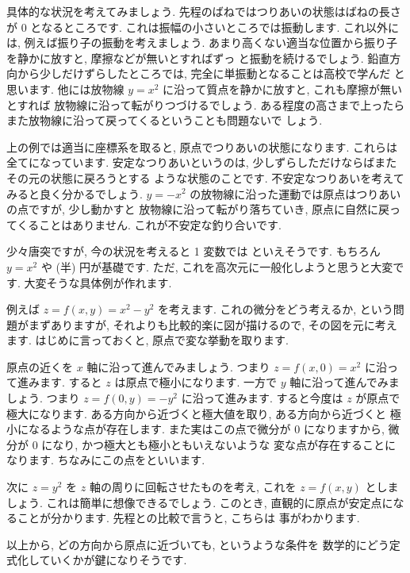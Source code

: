 \documentclass[openany, a4paper, oneside]{jsbook}
\begin{document}
具体的な状況を考えてみましょう.
先程のばねではつりあいの状態はばねの長さが 0 となるところです.
これは振幅の小さいところでは振動します.
これ以外には, 例えば振り子の振動を考えましょう.
あまり高くない適当な位置から振り子を静かに放すと, 摩擦などが無いとすればずっ
と振動を続けるでしょう.
鉛直方向から少しだけずらしたところでは, 完全に単振動となることは高校で学んだ
と思います.
他には放物線 $y=x^2$ に沿って質点を静かに放すと, これも摩擦が無いとすれば
放物線に沿って転がりつづけるでしょう.
ある程度の高さまで上ったらまた放物線に沿って戻ってくるということも問題ないで
しょう.

上の例では適当に座標系を取ると, 原点でつりあいの状態になります.
これらは全てになっています.
安定なつりあいというのは, 少しずらしただけならばまたその元の状態に戻ろうとする
ような状態のことです.
不安定なつりあいを考えてみると良く分かるでしょう.
 $y=-x^2$ の放物線に沿った運動では原点はつりあいの点ですが, 少し動かすと
放物線に沿って転がり落ちていき, 原点に自然に戻ってくることはありません.
これが不安定な釣り合いです.

少々唐突ですが, 今の状況を考えると 1 変数では
といえそうです. もちろん $y=x^2$ や (半) 円が基礎です.
ただ, これを高次元に一般化しようと思うと大変です.
大変そうな具体例が作れます.

例えば $z=f (x,y)=x^2-y^2$ を考えます.
これの微分をどう考えるか, という問題がまずありますが,
それよりも比較的楽に図が描けるので, その図を元に考えます.
はじめに言っておくと, 原点で変な挙動を取ります.

原点の近くを $x$ 軸に沿って進んでみましょう.
つまり $z=f (x,0)=x^2$ に沿って進みます.
すると $z$ は原点で極小になります.
一方で $y$ 軸に沿って進んでみましょう.
つまり $z=f (0,y)=-y^2$ に沿って進みます.
すると今度は $z$ が原点で極大になります.
ある方向から近づくと極大値を取り, ある方向から近づくと
極小になるような点が存在します.
また実はこの点で微分が 0 になりますから,
微分が 0 になり, かつ極大とも極小ともいえないような
変な点が存在することになります.
ちなみにこの点をといいます.

次に $z=y^2$ を $z$ 軸の周りに回転させたものを考え,
これを $z=f (x,y)$ としましょう.
これは簡単に想像できるでしょう.
このとき, 直観的に原点が安定点になることが分かります.
先程との比較で言うと, こちらは
事がわかります.

以上から, どの方向から原点に近づいても, というような条件を
数学的にどう定式化していくかが鍵になりそうです.
\end{document}
